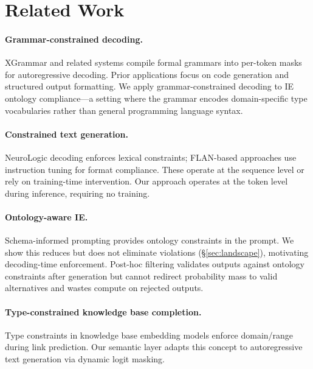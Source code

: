 \documentclass[11pt,a4paper]{article}
\begin{document}
\section{Related Work}
\label{sec:related}

\paragraph{Grammar-constrained decoding.}
XGrammar \citep{dong2024xgrammar} and related systems compile formal grammars into per-token masks for autoregressive decoding.
Prior applications focus on code generation and structured output formatting.
We apply grammar-constrained decoding to IE ontology compliance---a setting where the grammar encodes domain-specific type vocabularies rather than general programming language syntax.

\paragraph{Constrained text generation.}
NeuroLogic decoding \citep{lu2022neurologic} enforces lexical constraints; FLAN-based approaches use instruction tuning for format compliance.
These operate at the sequence level or rely on training-time intervention.
Our approach operates at the token level during inference, requiring no training.

\paragraph{Ontology-aware IE.}
Schema-informed prompting \citep{li2023schema} provides ontology constraints in the prompt.
We show this reduces but does not eliminate violations (\S\ref{sec:landscape}), motivating decoding-time enforcement.
Post-hoc filtering validates outputs against ontology constraints after generation but cannot redirect probability mass to valid alternatives and wastes compute on rejected outputs.

\paragraph{Type-constrained knowledge base completion.}
Type constraints in knowledge base embedding models \citep{krompass2015type} enforce domain/range during link prediction.
Our semantic layer adapts this concept to autoregressive text generation via dynamic logit masking.
\end{document}

